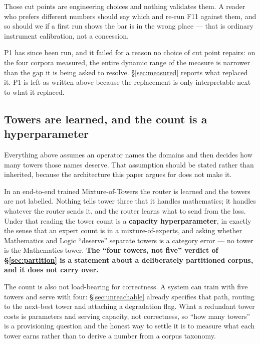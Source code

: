 \documentclass[11pt]{article}
\begin{document}
Those cut points are engineering choices and nothing validates them. A reader who prefers different numbers should say which and re-run F11 against them, and so should we if a first run shows the bar is in the wrong place --- that is ordinary instrument calibration, not a concession.

P1 has since been run, and it failed for a reason no choice of cut point repairs: on the four corpora measured, the entire dynamic range of the measure is narrower than the gap it is being asked to resolve. \S\ref{sec:measured} reports what replaced it. P1 is left as written above because the replacement is only interpretable next to what it replaced.

\subsection{Towers are learned, and the count is a hyperparameter}
\label{sec:emergent}

Everything above assumes an operator names the domains and then decides how many towers those names deserve. That assumption should be stated rather than inherited, because the architecture this paper argues for does not make it.

In an end-to-end trained Mixture-of-Towers the router is learned and the towers are not labelled. Nothing tells tower three that it handles mathematics; it handles whatever the router sends it, and the router learns what to send from the loss. Under that reading the tower count is a \textbf{capacity hyperparameter}, in exactly the sense that an expert count is in a mixture-of-experts, and asking whether Mathematics and Logic ``deserve'' separate towers is a category error --- no tower is the Mathematics tower. \textbf{The ``four towers, not five'' verdict of \S\ref{sec:partition} is a statement about a deliberately partitioned corpus, and it does not carry over.}

The count is also not load-bearing for correctness. A system can train with five towers and serve with four: \S\ref{sec:unreachable} already specifies that path, routing to the next-best tower and attaching a degradation flag. What a redundant tower costs is parameters and serving capacity, not correctness, so ``how many towers'' is a provisioning question and the honest way to settle it is to measure what each tower earns rather than to derive a number from a corpus taxonomy.
\end{document}
